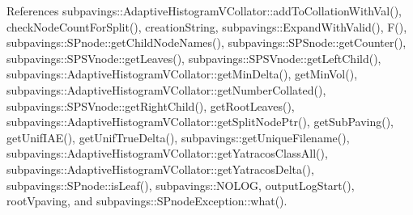 \-References subpavings\-::\-Adaptive\-Histogram\-V\-Collator\-::add\-To\-Collation\-With\-Val(), check\-Node\-Count\-For\-Split(), creation\-String, subpavings\-::\-Expand\-With\-Valid(), \-F(), subpavings\-::\-S\-Pnode\-::get\-Child\-Node\-Names(), subpavings\-::\-S\-P\-Snode\-::get\-Counter(), subpavings\-::\-S\-P\-S\-Vnode\-::get\-Leaves(), subpavings\-::\-S\-P\-S\-Vnode\-::get\-Left\-Child(), subpavings\-::\-Adaptive\-Histogram\-V\-Collator\-::get\-Min\-Delta(), get\-Min\-Vol(), subpavings\-::\-Adaptive\-Histogram\-V\-Collator\-::get\-Number\-Collated(), subpavings\-::\-S\-P\-S\-Vnode\-::get\-Right\-Child(), get\-Root\-Leaves(), subpavings\-::\-Adaptive\-Histogram\-V\-Collator\-::get\-Split\-Node\-Ptr(), get\-Sub\-Paving(), get\-Unif\-I\-A\-E(), get\-Unif\-True\-Delta(), subpavings\-::get\-Unique\-Filename(), subpavings\-::\-Adaptive\-Histogram\-V\-Collator\-::get\-Yatracos\-Class\-All(), subpavings\-::\-Adaptive\-Histogram\-V\-Collator\-::get\-Yatracos\-Delta(), subpavings\-::\-S\-Pnode\-::is\-Leaf(), subpavings\-::\-N\-O\-L\-O\-G, output\-Log\-Start(), root\-Vpaving, and subpavings\-::\-S\-Pnode\-Exception\-::what().


